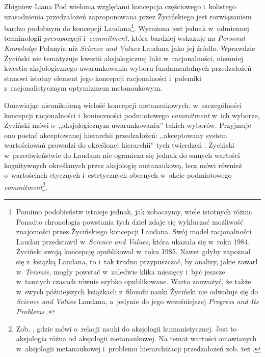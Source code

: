 \begin{artplenv}{Zbigniew Liana}
Pod wieloma względami koncepcja częściowego i~kolistego uzasadnienia przedzałożeń zaproponowana przez Życińskiego jest rozwiązaniem bardzo podobnym do koncepcji Laudana\footnote{Pomimo podobieństw istnieje jednak, jak zobaczymy, wiele istotnych różnic. Ponadto chronologia powstania tych dzieł zdaje się wykluczać możliwość znajomości przez Życińskiego koncepcji Laudana. Swój model racjonalności Laudan przedstawił w~\textit{Science and Values}, która ukazała się w~roku 1984. Życiński swoją koncepcję opublikował w~roku 1985. Nawet gdyby zapoznał się z~książką Laudana, to i~tak trudno przypuszczać, by analizy, jakie zawarł w~\textit{Teizmie}, mogły powstać w~zaledwie klika miesięcy i~być jeszcze w~tamtych czasach równie szybko opublikowane. Warto zauważyć, że także w~swych późniejszych książkach z~filozofii nauki Życiński nie odwołuje się do \textit{Science and Values} Laudana, a~jedynie do jego wcześniejszej \textit{Progress and Its Problems}
\parencite*[][]{laudan_progress_1977}.%
}. Wyrażona jest jednak w~odmiennej terminologii \textit{presupozycji} i~\textit{commitment}, która bardziej wskazuje na \textit{Personal Knowledge} Polanyia 
\parencite*[][]{polanyi_personal_1962} %
 niż \textit{Science and Values} Laudana 
\parencite*[][]{laudan_science_1984} %
 jako jej źródło. Wprawdzie Życiński nie tematyzuje kwestii aksjologicznej luki w~racjonalności, niemniej kwestia aksjologicznego uwarunkowania wyboru fundamentalnych przedzałożeń stanowi istotny element jego koncepcji racjonalności i~polemiki z~racjonalistycznym optymizmem metanaukowym.

Omawiając nieuniknioną wielość koncepcji metanaukowych, w~szczególności koncepcji racjonalności i~konieczności podmiotowego \textit{commitment} w~ich wyborze, Życiński mówi o~,,aksjologicznym uwarunkowaniu'' takich wyborów. Przyjmuje ono postać akceptowanej hierarchii przedzałożeń: ,,akceptowany system wartościowań prowadzi do określonej hierarchii'' tych twierdzeń
\parencite[][s.~225]{zycinski_teizm_1985}. %
 Życiński w~przeciwieństwie do Laudana nie ogranicza się jednak do samych wartości kognitywnych określanych przez aksjologię metanaukową, lecz mówi również o~wartościach etycznych i~estetycznych obecnych w~akcie podmiotowego \textit{commitment}\footnote{Zob. 
\parencites[][s.~147–156]{zycinski_structure_1988}[][s.~257–274]{zycinski_struktura_2013_liana}, %
 gdzie mówi o~relacji nauki do aksjologii humanistycznej. Jest to aksjologia różna od aksjologii metanaukowej. Na temat wartości omawianych w~aksjologii metanaukowej i~problemu hierarchizacji przedzałożeń zob. też 
\parencite[][s.~161.169n]{zycinski_teizm_1985}.%
}.


\end{artplenv}

